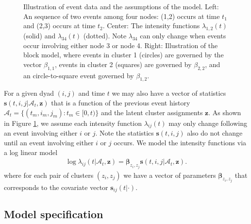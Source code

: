 \documentclass[11pt]{article}
\begin{document}
\begin{figure}
 \def\svgwidth{6in}
  
\caption{Illustration of event data and the assumptions of the model.  Left: An sequence of two events among four nodes: (1,2) occurs at time $t_1$ and (2,3) occurs at time $t_2$.  Center: The intensity functions $\lambda_{1,2}(t)$ (solid) and $\lambda_{34}(t)$ (dotted).  Note $\lambda_{34}$ can only change when events occur involving either node 3 or node 4.  Right: Illustration of the block model, where events in cluster 1 (circles) are governed by the vector $\beta_{1,1}$, events in cluster 2 (squares) are governed by $\beta_{2,2}$, and an circle-to-square event governed by $\beta_{1,2}$.}
\label{fig:example}
\end{figure}

For a given dyad $(i,j)$ and time $t$ we may also have a vector of statistics $\mathbf{s}(t,i,j|\mathcal{A}_t,\mathbf{z})$ that is a function of the previous event history  $\mathcal{A}_t = \{(t_m,i_m,j_m): t_m \in [0,t)\}$  and the latent cluster assignments $\mathbf{z}$.   As shown in Figure \ref{fig:example}, we assume each intensity function $\lambda_{ij}(t)$ may only change following an event involving either $i$ or $j$.  Note the statistics $\mathbf{s}(t,i,j)$ also do not change until an event involving either $i$ or $j$ occurs.  We model the intensity functions via a log linear model
\begin{align}
\log \lambda_{ij}(t | \mathcal{A}_t,\mathbf{z}) = \boldsymbol{\beta}_{z_i,z_j} \mathbf{s}(t,i,j|\mathcal{A}_t,\mathbf{z}).
\end{align}
where for each pair of clusters $(z_i,z_j)$ we have a vector of parameters $\boldsymbol{\beta}_{z_i,z_j}$ that corresponds to the covariate vector $\mathbf{s}_{ij}(t|\cdot)$.  

\subsection{Model specification}
\end{document}
